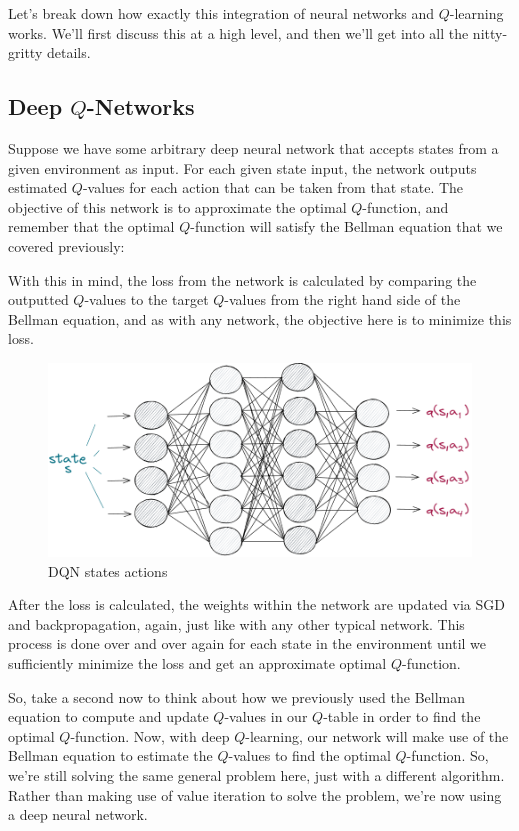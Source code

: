 Let's break down how exactly this integration of neural networks and $Q$-learning works. 
We'll first discuss this at a high level, and then we'll get into all the nitty-gritty 
details.


\subsection{Deep $Q$-Networks}

Suppose we have some arbitrary deep neural network that accepts states from a given 
environment as input. For each given state input, the network outputs estimated $Q$-values 
for each action that can be taken from that state. The objective of this network is to 
approximate the optimal $Q$-function, and remember that the optimal $Q$-function will 
satisfy the Bellman equation that we covered previously:

With this in mind, the loss from the network is calculated by comparing the outputted 
$Q$-values to the target $Q$-values from the right hand side of the Bellman equation, 
and as with any network, the objective here is to minimize this loss.

\begin{figure}[H]
\centering
\includegraphics[scale=0.618]{pix/q_learning/q_network.png}
\caption{DQN states actions}
\end{figure}

After the loss is calculated, the weights within the network are updated via SGD and 
backpropagation, again, just like with any other typical network. This process is done 
over and over again for each state in the environment until we sufficiently minimize 
the loss and get an approximate optimal $Q$-function.

So, take a second now to think about how we previously used the Bellman equation to 
compute and update $Q$-values in our $Q$-table in order to find the optimal $Q$-function. 
Now, with deep $Q$-learning, our network will make use of the Bellman equation to estimate 
the $Q$-values to find the optimal $Q$-function. So, we're still solving the same general 
problem here, just with a different algorithm. Rather than making use of value iteration 
to solve the problem, we're now using a deep neural network.

